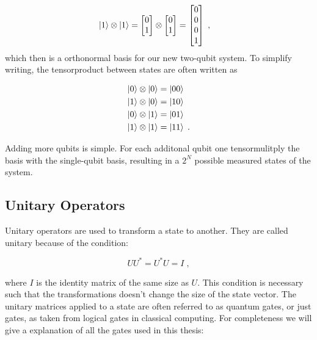 \begin{gather}
\begin{aligned}
    \ket{1} \otimes \ket{1} = \begin{bmatrix} 0 \\ 1 \end{bmatrix} \otimes \begin{bmatrix} 0 \\ 1 \end{bmatrix} &=  \begin{bmatrix} 0 \\ 0 \\ 0 \\ 1\end{bmatrix} \; ,  
\end{aligned}
\end{gather}
which then is a orthonormal basis for our new two-qubit system. To simplify writing, the tensorproduct between states are often written as

\begin{gather}
\begin{aligned}
    \ket{0} \otimes \ket{0} &= \ket{00} \\
    \ket{1} \otimes \ket{0} &= \ket{10} \\
    \ket{0} \otimes \ket{1} &= \ket{01} \\
    \ket{1} \otimes \ket{1} &= \ket{11} \; .
\end{aligned}
\end{gather}

Adding more qubits is simple. For each additonal qubit one tensormulitply the basis with the single-qubit basis, resulting in a $2^N$ possible measured states of the system. 
\subsection{Unitary Operators}

Unitary operators are used to transform a state to another. They are called unitary because of the condition:

\begin{equation}\label{eq:unitarydef}
    UU^* = U^*U = I \; ,
\end{equation}

where $I$ is the identity matrix of the same size as $U$. This condition is necessary such that the transformations doesn't change the size of the state vector. The unitary matrices applied to a state are often referred to as quantum gates, or just gates, as taken from logical gates in classical computing. For completeness we will give a explanation of all the gates used in this thesis:

